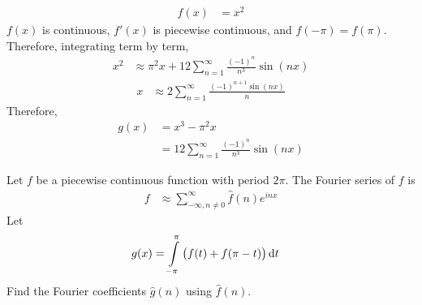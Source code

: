 \documentclass[fleqn, a4paper, 11pt, oneside]{amsart}
\theoremstyle{definition}
\theoremstyle{theorem}
\begin{document}
\begin{solution}
	\begin{align*}
		f(x) & = x^2
	\end{align*}
	$f(x)$ is continuous, $f'(x)$ is piecewise continuous, and $f(-\pi) = f(\pi)$.\\
	Therefore, integrating term by term,
	\begin{align*}
		x^2 & \approx \pi^2 x + 12 \sum\limits_{n = 1}^{\infty} \frac{(-1)^n}{n^3} \sin(n x)
	\end{align*}
	\begin{align*}
		x & \approx 2 \sum\limits_{n = 1}^{\infty} \frac{(-1)^{n + 1} \sin(n x)}{n}
	\end{align*}
	Therefore,
	\begin{align*}
		g(x) & = x^3 - \pi^2 x \\
                     & = 12 \sum\limits_{n = 1}^{\infty} \frac{(-1)^n}{n^3} \sin(n x)
	\end{align*}
\end{solution}

\begin{question}
	Let $f$ be a piecewise continuous function with period $2 \pi$.
	The Fourier series of $f$ is
	\begin{align*}
		f & \approx \sum\limits_{-\infty , n \neq 0}^{\infty} \hat{f}(n) e^{i n x}
	\end{align*}
	Let
	\begin{align*}
		g(x) & = \int\limits_{-\pi}^{\pi} \left( f(t) + f(\pi - t) \right) \dif t
	\end{align*}
	Find the Fourier coefficients $\hat{g}(n)$ using $\hat{f}(n)$.
\end{question}
\end{document}
